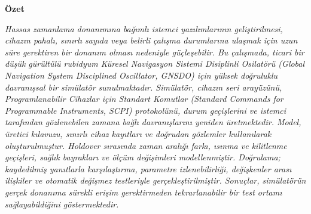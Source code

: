 \documentclass[9pt,twocolumn,a4paper]{extarticle}
\begin{document}
\shorthandoff{=}


\begin{center}
  {\fontsize{10}{10.8}\selectfont\bfseries Özet\par}
\end{center}
\vspace{-6pt}
{\fontsize{9}{10.8}\selectfont\itshape
\noindent Hassas zamanlama donanımına bağımlı istemci yazılımlarının geliştirilmesi, cihazın pahalı, sınırlı sayıda veya belirli çalışma durumlarına ulaşmak için uzun süre gerektiren bir donanım olması nedeniyle güçleşebilir. Bu çalışmada, ticari bir düşük gürültülü rubidyum Küresel Navigasyon Sistemi Disiplinli Osilatörü (\emph{Global Navigation System Disciplined Oscillator}, GNSDO) için yüksek doğruluklu davranışsal bir simülatör sunulmaktadır. Simülatör, cihazın seri arayüzünü, Programlanabilir Cihazlar için Standart Komutlar (\emph{Standard Commands for Programmable Instruments}, SCPI) protokolünü, durum geçişlerini ve istemci tarafından gözlenebilen zamana bağlı davranışlarını yeniden üretmektedir. Model, üretici kılavuzu, sınırlı cihaz kayıtları ve doğrudan gözlemler kullanılarak oluşturulmuştur. Holdover sırasında zaman aralığı farkı, ısınma ve kilitlenme geçişleri, sağlık bayrakları ve ölçüm değişimleri modellenmiştir. Doğrulama; kaydedilmiş yanıtlarla karşılaştırma, parametre izlenebilirliği, değişkenler arası ilişkiler ve otomatik değişmez testleriyle gerçekleştirilmiştir. Sonuçlar, simülatörün gerçek donanıma sürekli erişim gerektirmeden tekrarlanabilir bir test ortamı sağlayabildiğini göstermektedir.\par}
\end{document}
